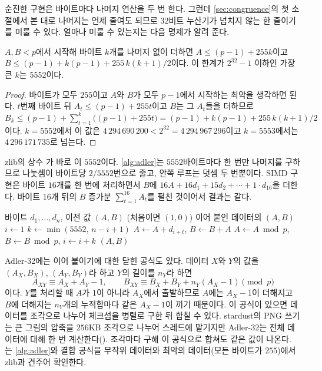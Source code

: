 순진한 구현은 바이트마다 나머지 연산을 두 번 한다. 그런데 \cref{sec:congruence}의 첫 소절에서 본 대로 나머지는 언제 줄여도 되므로 $32$비트 누산기가 넘치지 않는 한 줄이기를 미룰 수 있다. 얼마나 미룰 수 있는지는 다음 명제가 알려 준다.

\begin{proposition}
\label{prop:adler-nmax}
$A,B<p$에서 시작해 바이트 $k$개를 나머지 없이 더하면 $A\le(p-1)+255k$이고 $B\le(p-1)+k(p-1)+255\,k(k+1)/2$이다. 이 한계가 $2^{32}-1$ 이하인 가장 큰 $k$는 $5552$이다.
\end{proposition}

\begin{proof}
바이트가 모두 $255$이고 $A$와 $B$가 모두 $p-1$에서 시작하는 최악을 생각하면 된다. $t$번째 바이트 뒤 $A_t\le(p-1)+255t$이고 $B$는 그 $A_t$들을 더하므로 $B_k\le(p-1)+\sum_{t=1}^k\bigl((p-1)+255t\bigr)=(p-1)+k(p-1)+255\,k(k+1)/2$이다. $k=5552$에서 이 값은 $4\,294\,690\,200<2^{32}=4\,294\,967\,296$이고 $k=5553$에서는 $4\,296\,171\,735$로 넘는다.
\end{proof}

zlib의 상수 가 바로 이 $5552$이다. \cref{alg:adler}는 $5552$바이트마다 한 번만 나머지를 구하므로 나눗셈이 바이트당 $2/5552$번으로 줄고, 안쪽 루프는 덧셈 두 번뿐이다. SIMD 구현은 바이트 $16$개를 한 번에 처리하면서 $B$에 $16A+16d_1+15d_2+\cdots+1\cdot d_{16}$을 더한다. 바이트 $16$개 뒤의 $B$ 증가분 $\sum_{t=1}^{16}A_t$를 펼친 것이어서 결과는 같다.

\begin{algorithm}[htbp]
\begin{algorithmic}[1]
\Require 바이트 $d_1,\dots,d_n$, 이전 값 $(A,B)$ (처음이면 $(1,0)$)
\Ensure 이어 붙인 데이터의 $(A,B)$
\State $i\gets1$
  \State $k\gets\min(5552,\,n-i+1)$ 
   $A\gets A+d_{i+t}$, $B\gets B+A$
  \EndFor
  \State $A\gets A\bmod p$, $B\gets B\bmod p$, $i\gets i+k$
\EndWhile
\State \Return $(A,B)$
\end{algorithmic}
\caption{Adler-32 ($p=65521$, 나머지를 미룬 형태)}
\label{alg:adler}
\end{algorithm}

Adler-32에는 이어 붙이기에 대한 닫힌 공식도 있다. 데이터 $X$와 $Y$의 값을 $(A_X,B_X)$, $(A_Y,B_Y)$라 하고 $Y$의 길이를 $n_Y$라 하면
\[
A_{XY}\equiv A_X+A_Y-1,\qquad B_{XY}\equiv B_X+B_Y+n_Y(A_X-1)\pmod p
\]
이다. $Y$를 처리할 때 $A$가 $1$이 아니라 $A_X$에서 출발하므로 $A$에는 $A_X-1$이 더해지고 $B$에 더해지는 $n_Y$개의 누적합마다 같은 $A_X-1$이 끼기 때문이다. 이 공식이 있으면 데이터를 조각으로 나누어 체크섬을 병렬로 구한 뒤 합칠 수 있다. stardust의 PNG 쓰기는 큰 그림의 압축을 $256$KB 조각으로 나누어 스레드에 맡기지만 Adler-32는 전체 데이터에 대해 한 번 계산한다(). 조각마다 구해 이 공식으로 합쳐도 같은 값이 나온다. 는 \cref{alg:adler}와 결합 공식을 무작위 데이터와 최악의 데이터(모든 바이트가 $255$)에서 zlib과 견주어 확인한다.


